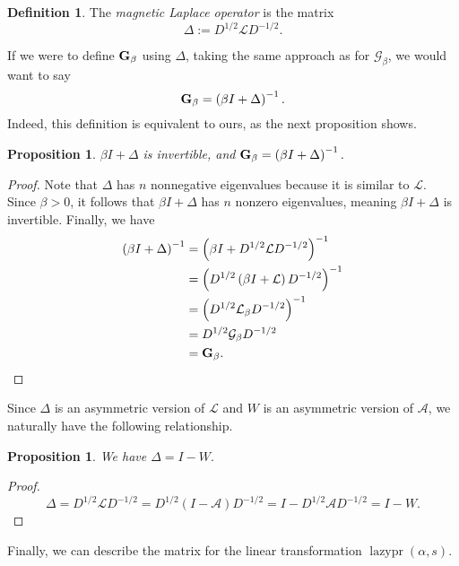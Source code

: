 \documentclass{article}
\newtheorem{prop}[thm]{Proposition}
\theoremstyle{definition}
\newtheorem{defn}[thm]{Definition}
\DeclareMathOperator{\lazypr}{lazypr}
\newcommand{\lap}{\mathcal{L}}
\newcommand{\normadj}{\mathcal{A}}
\newcommand{\laplace}{\Delta}
\newcommand{\green}{\mathcal{G}}
\newcommand{\asymgreen}{\normalfont{\textbf{G}}}
\begin{document}
\begin{defn}
The \textit{magnetic Laplace operator} is the matrix
$$
\laplace := D^{1/2} \lap D^{-1/2}.
$$
\end{defn}

If we were to define $\asymgreen_\beta$ using $\laplace$, taking the same approach as for $\green_\beta$, we would want to say $$\asymgreen_\beta = \left( \beta I + \laplace \right)^{-1}.$$ Indeed, this definition is equivalent to ours, as the next proposition shows.

\begin{prop}\label{Asymmetric Green's in terms of Laplace operator}
$\beta I + \laplace$ is invertible, and $\asymgreen_\beta = \left( \beta I + \laplace \right)^{-1}.$
\end{prop}
\begin{proof}
Note that $\laplace$ has $n$ nonnegative eigenvalues because it is similar to $\lap$. Since $\beta > 0$, it follows that $\beta I + \laplace$ has $n$ nonzero eigenvalues, meaning $\beta I + \laplace$ is invertible. Finally, we have
\begin{align*}
\left( \beta I + \laplace \right)^{-1}
&= \left( \beta I + D^{1/2} \lap D^{-1/2} \right)^{-1} \\
&= \left(D^{1/2} \left( \beta I + \lap \right) D^{-1/2} \right)^{-1} \\
&= \left(D^{1/2} \lap_\beta D^{-1/2} \right)^{-1} \\
&= D^{1/2} \green_\beta D^{-1/2} \\
&= \asymgreen_\beta.
\end{align*}
\end{proof}

Since $\laplace$ is an asymmetric version of $\lap$ and $W$ is an asymmetric version of $\normadj$, we naturally have the following relationship.

\begin{prop}\label{Laplace operator and PageRank}
We have $\laplace = I - W.$
\end{prop}
\begin{proof}
$$
\laplace 
= D^{1/2} \lap D^{-1/2} 
= D^{1/2} (I - \normadj) D^{-1/2}
= I - D^{1/2} \normadj D^{-1/2}
= I - W.
$$
\end{proof}

Finally, we can describe the matrix for the linear transformation $\lazypr(\alpha, s)$.
\end{document}
